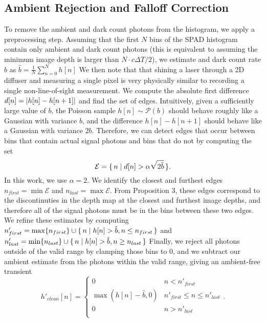 \subsection{Ambient Rejection and Falloff Correction}
To remove the ambient and dark count photons from the histogram, we apply a
preprocessing step. Assuming that the first $N$ bins of the SPAD histogram
contain only ambient and dark count photons (this is equivalent to assuming the
minimum image depth is larger than $N \cdot c\Delta T/2$), we estimate 
and dark count rate $b$ as $\hat b = \frac{1}{N}\sum_{n=0}^N h[n]$ We then
note that that shining a laser through a 2D diffuser and
measuring a single pixel is very physically similar to recording a single 
non-line-of-sight measurement. We
compute the absolute first difference $d[n] = \lvert h[n] - h[n+1]\rvert$ and find 
the set of edges. Intuitively, given a sufficiently large value of $b$, the Poisson sample
$h[n] \sim \mathcal{P}(b)$ should behave roughly like a Gaussian with variance $b$, and the difference
$h[n] - h[n+1]$ should behave like a Gaussian with variance $2b$. Therefore, we
can detect edges that occur between bins that contain actual signal photons and
bins that do not by computing the set 
\begin{equation}
  \mathcal{E} = \{\, n \mid d[n] > \alpha\sqrt{2\hat b} \,\}.
  \label{eq:edge_set}
\end{equation}
In this work, we use $\alpha = 2$.
We identify the closest and furthest edges $n_{first} = \min \mathcal{E}$ and
$n_{last} = \max \mathcal{E}$.
From \cite{Xin2019} Proposition 3, these edges
correspond to the discontinuties in the depth map 
at the closest and furthest image depths, and therefore all of the signal
photons must be in the bins between these two edges.
We refine these estimates by
computing $n'_{first} = \max\{n_{first}\}\cup\{\, n \mid h[n] > \hat b, n \leq n_{first} \,\}$ and
$n'_{last} = \min\{n_{last}\}\cup\{\, n \mid h[n] > \hat b, n \geq n_{last} \,\}$
Finally, we reject all photons outside of the valid range by clamping those bins
to 0, and we subtract our ambient estimate from the photons within the valid
range, giving an ambient-free transient
\begin{equation}
  h'_{clean}[n] = \begin{cases}
    0 & n < n'_{first} \\
    \max(h[n] - \hat b, 0) & n'_{first} \leq n \leq n'_{last} \\
    0 & n > n'_{last} \\
  \end{cases}.
  \label{eq:h_clean}
\end{equation}
